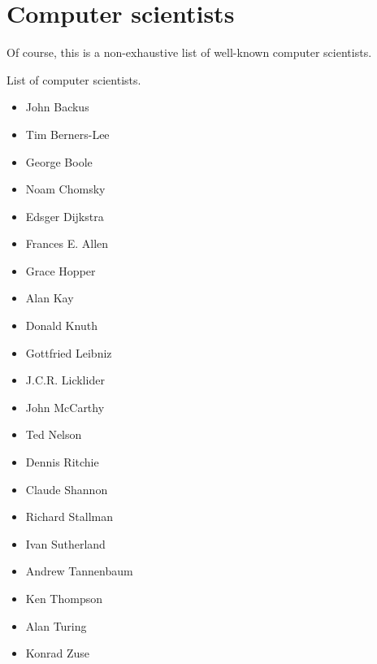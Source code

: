 \section{Computer scientists}
%
Of course, this is a non-exhaustive list of well-known computer scientists.

List of computer scientists.

\begin{itemize}
  \item John Backus
  \item Tim Berners-Lee
  \item George Boole
  \item Noam Chomsky
  \item Edsger Dijkstra
  \item Frances E. Allen
  \item Grace Hopper
  \item Alan Kay
  \item Donald Knuth
  \item Gottfried Leibniz
  \item J.C.R. Licklider
  \item John McCarthy
  \item Ted Nelson
  \item Dennis Ritchie
  \item Claude Shannon
  \item Richard Stallman
  \item Ivan Sutherland
  \item Andrew Tannenbaum
  \item Ken Thompson
  \item Alan Turing
  \item Konrad Zuse
\end{itemize}
